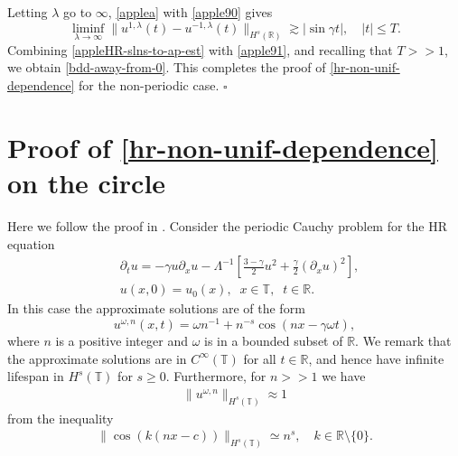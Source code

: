 \documentclass[12pt,reqno]{amsart}
\renewcommand{\qedsymbol}{\ensuremath{\square}}
\newcommand{\rr}{\mathbb{R}}
\newcommand{\p}{\partial}
\newcommand{\ci}{\mathbb{T}}
\theoremstyle{plain}  %
\theoremstyle{definition}
\begin{document}
%
%
%
%
Letting $\lambda$ go to $\infty$,  \autoref{applea}
with \eqref{apple90}  gives
%
%
%
%
\begin{equation} \label{apple91}
\liminf_{\lambda \to\infty}
\|
u^{1,\lambda}(t)
-
u^{- 1,\lambda}(t)
\|_{H^s(\rr)}
\gtrsim
|\sin \gamma t|, \quad |t| \le T.
\end{equation}
%
%
Combining \eqref{appleHR-slns-to-ap-est} with \eqref{apple91}, and 
recalling that $T >>1$, we obtain \eqref{bdd-away-from-0}. This completes 
the proof of \autoref{hr-non-unif-dependence} for the
non-periodic case. \qquad \qedsymbol
%
%
%
%
%
%
%
%
\section{Proof of \autoref{hr-non-unif-dependence}
on the circle}
\label{sec:3}
\setcounter{equation}{0}
%
Here we follow the proof in \cite{Himonas_2009_Non-uniform-dep-per}. 
Consider the periodic Cauchy problem for the HR equation
%
\begin{align}
& \p_t u = -\gamma u \p_x u  - \Lambda^{-1} \left[ \frac{3 - 
\gamma}{2}u^2 +
\frac{\gamma}{2}(\p_x u)^2 \right] ,
\label{hyperelastic-rod-equation}
\\
& u(x,0) = u_0(x), \; \; x \in \ci, \; \; t \in \rr.  \label{init-cond}
\end{align}
%
%
%
In this case the  approximate solutions are of the form
%
%
\begin{equation}
\label{approx-solutions-form}
u^{\omega,n}(x,t) = \omega n^{-1} + n^{-s} \cos \left( nx - \gamma \omega t
\right), 
\end{equation}
where $n$ is a positive integer and $\omega$ is in a bounded subset of 
$\rr$. We remark that the approximate 
solutions are in $C^\infty(\ci)$ for all $t \in \rr$, and hence have 
infinite lifespan in $H^s(\ci)$ for $s  \ge 0$. Furthermore, for $n>>1$ we 
have 
%
%
\begin{equation}
	\label{bound-approx}
	\begin{split}
		\|u^{\omega,n} \|_{H^s(\ci)} \approx 1	
	\end{split}
\end{equation}
%
%
from the inequality
\begin{equation}
\label{1m}
\begin{split}
	\|\cos(k(nx-c))\|_{H^s(\ci)} \simeq n^s, \quad k \in \rr \setminus
	\{0\}.
\end{split}
\end{equation}
\end{document}
